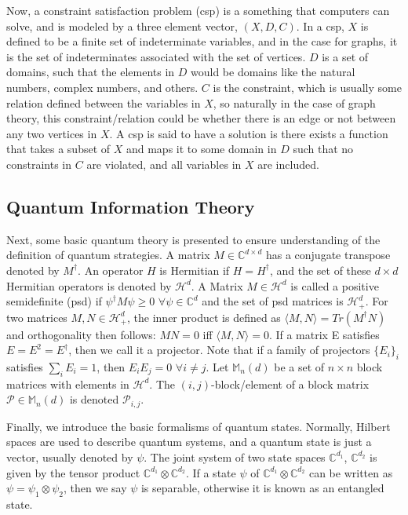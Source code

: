 \documentclass[12pt]{article}
\begin{document}
Now, a constraint satisfaction problem (csp) is a something that
computers can solve, and is modeled by a three element vector, $(X,
D, C)$. In a csp, $X$ is defined to be a finite set of indeterminate
variables, and in the case for graphs, it is the set of indeterminates
associated with the set of vertices. $D$ is a set of domains, such
that the elements in $D$ would be domains like the natural numbers,
complex numbers, and others. $C$ is the constraint, which is usually
some relation defined between the variables in $X$, so naturally in
the case of graph theory, this constraint/relation could be whether
there is an edge or not between any two vertices in $X$. A csp is said
to have a solution is there exists a function that takes a subset of
$X$ and maps it to some domain in $D$ such that no constraints in $C$
are violated, and all variables in $X$ are included.

\subsection{Quantum Information Theory}
\label{ssec:qit}

Next, some basic quantum theory is presented to ensure understanding
of the definition of quantum strategies. A matrix $M \in \mathbb{C}^{d
  \times d}$ has a conjugate transpose denoted by $M^\dag$. An
operator $H$ is Hermitian if $H = {H^{\dag}}$, and the set of these $d
\times d$ Hermitian operators is denoted by $\mathcal{H}^d$. A Matrix
$M \in \mathcal{H}^d$ is called a positive semidefinite (psd) if
$\psi^\dag M \psi \geq 0$ $\forall \psi \in \mathbb{C}^d$ and the set
of psd matrices is $\mathcal{H}^d_+$. For two matrices $M, N \in
\mathcal{H}^d_+$, the inner product is defined as $\langle M, N\rangle
= Tr(M^\dag N)$ and orthogonality then follows: $MN = 0$ iff $\langle
M, N \rangle = 0$. If a matrix E satisfies $E = E^2 = E^\dag$, then we
call it a projector. Note that if a family of projectors $\{E_i\}_i$
satisfies $\sum_iE_i = 1$, then $E_iE_j = 0$ $\forall i \neq j$. Let
$\mathbb{M}_n(d)$ be a set of $n \times n$ block matrices with
elements in $\mathcal{H}^d$. The $(i, j)$-block/element of a block
matrix $\mathcal{P} \in \mathbb{M}_n(d)$ is denoted $\mathcal{P}_{i,
  j}$.

Finally, we introduce the basic formalisms of quantum
states. Normally, Hilbert spaces are used to describe quantum systems,
and a quantum state is just a vector, usually denoted by $\psi$. The
joint system of two state spaces $\mathbb{C}^{d_1}$,
$\mathbb{C}^{d_2}$ is given by the tensor product $\mathbb{C}^{d_1}
\otimes \mathbb{C}^{d_2}$. If a state $\psi$ of $\mathbb{C}^{d_1}
\otimes \mathbb{C}^{d_2}$ can be written as $\psi = \psi_1 \otimes
\psi_2$, then we say $\psi$ is separable, otherwise it is known as an
entangled state.
\end{document}
